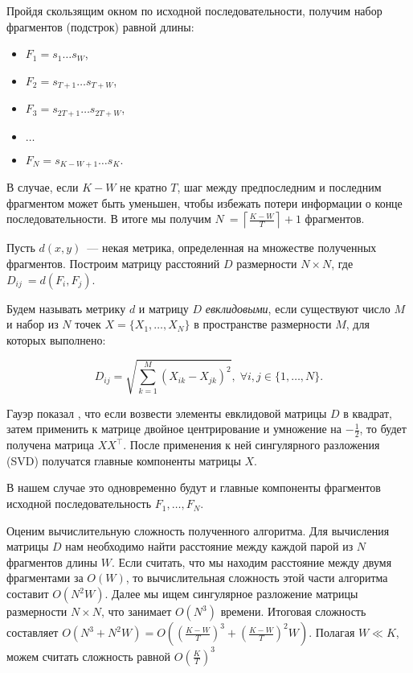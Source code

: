 Пройдя скользящим окном по исходной последовательности, получим набор фрагментов (подстрок) равной длины:

\begin{itemize}
  \item $F_1 = s_1\ldots s_W$,
  \item $F_2 = s_{T+1}\ldots s_{T+W}$,
  \item $F_3 = s_{2T+1}\ldots s_{2T + W}$,
  \item $\ldots$
  \item $F_N = s_{K-W+1}\ldots s_K$.
\end{itemize}

В случае, если $K-W$ не кратно $T$, шаг между предпоследним и последним фрагментом может быть уменьшен, чтобы избежать потери информации о конце последовательности. В итоге мы получим $N~= \left\lceil\frac{K-W}{T}\right\rceil + 1$ фрагментов.

Пусть $d(x,y)$~--- некая метрика, определенная на множестве полученных фрагментов. Построим матрицу расстояний $D$ размерности $N\times N$, где $D_{ij}~= d(F_i, F_j)$.

Будем называть метрику $d$ и матрицу $D$ \textit{евклидовыми}, если существуют число $M$ и набор из $N$ точек $X = \{X_1,\ldots,X_N\}$ в пространстве размерности $M$, для которых выполнено:

$$D_{ij} = \sqrt{\sum_{k=1}^M \left(X_{ik} - X_{jk}\right)^2}, \; \forall i, j \in \{1,\ldots, N\}.$$

Гауэр показал \cite{Gower1966}, что если возвести элементы евклидовой матрицы $D$ в квадрат, затем применить к матрице двойное центрирование и умножение на $-\frac{1}{2}$, то будет получена матрица $XX^\top$. После применения к ней сингулярного разложения (SVD) получатся главные компоненты матрицы $X$.

В нашем случае это одновременно будут и главные компоненты фрагментов исходной последовательность $F_1,\ldots,F_N$.

Оценим вычислительную сложность полученного алгоритма. Для вычисления матрицы $D$ нам необходимо найти расстояние между каждой парой из $N$ фрагментов длины $W$. Если считать, что мы находим расстояние между двумя фрагментами за $O(W)$, то вычислительная сложность этой части алгоритма составит $O(N^2W)$. Далее мы ищем сингулярное разложение матрицы размерности $N\times N$, что занимает $O(N^3)$ времени. Итоговая сложность составляет $O(N^3 + N^2W) = O\left(\left(\frac{K-W}{T}\right)^3 + \left(\frac{K-W}{T}\right)^2W\right)$. Полагая $W \ll K$, можем считать сложность равной $O\left(\frac{K}{T}\right)^3$

